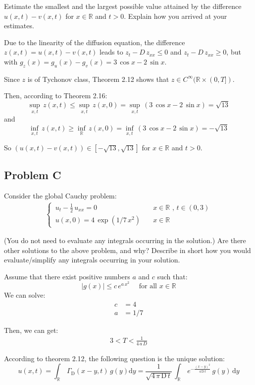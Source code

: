 \documentclass[../main.tex]{subfiles}
\begin{document}
Estimate the smallest and the largest possible value attained by the difference $u(x, t) - v(x, t)$ for $x \in \mathbb{R}$ and $t > 0$. Explain how you arrived at your estimates.

Due to the linearity of the diffusion equation, the difference $z(x,t) = u(x,t) - v(x,t)$ leads to $z_t - D \, z_{xx} \leqslant 0$ and $z_t - D \, z_{xx} \geqslant 0$, but with $g_z(x) = g_u(x) - g_v(x) = 3 \, \cos{x} - 2 \, \sin{x}$.

Since $z$ is of Tychonov class, Theorem 2.12 shows that $z \in C^{\infty}(\mathbb{R} \times (0,T])$.

Then, according to Theorem 2.16:
\begin{equation}
    \sup_{x,t} \, z(x,t) \leqslant \sup_{x,t} \, z(x,0) = \sup_{x,t} \, (3 \, \cos{x} - 2 \, \sin{x}) = \sqrt{13}
\end{equation}
and
\begin{equation}
    \inf_{x,t} \, z(x,t) \geqslant \inf_{\mathbb{R}} \, z(x,0) = \inf_{x,t} \, (3 \, \cos{x} - 2 \, \sin{x}) = - \sqrt{13}
\end{equation}

So $(u(x,t) - v(x,t)) \in [-\sqrt{13},\sqrt{13}]$ for $x \in \mathbb{R}$ and $t > 0$.

\subsection{Problem C}

Consider the global Cauchy problem:
\begin{align}
    \begin{cases}
        \, u_t - \frac{1}{2} \, u_{xx} = 0 \quad & x \in \mathbb{R} \text{ ,  } t \in (0,3) \\
        \, u(x,0) = 4 \, \exp{(1 / 7 \, x^2)} \quad & x \in \mathbb{R}
    \end{cases}
\end{align}

(You do not need to evaluate any integrals occurring in the solution.) Are there other solutions to the above problem, and why? Describe in short how you would evaluate/simplify any integrals occurring in your solution.

Assume that there exist positive numbers $a$ and $c$ such that:
\begin{equation}
    |g(x)| \leqslant c \, e^{a \, x^2} \quad \text{ for all  } x \in \mathbb{R}
\end{equation}
We can solve:
\begin{align}
    c &= 4 \\
    a &= 1 / 7
\end{align}

Then, we can get:
\begin{align}
    3 < T < \frac{1}{4 \, a \, D}
\end{align}

According to theorem 2.12, the following question is the unique solution:
\begin{equation}
    u(x,t) = \int_{\mathbb{R}} \, \Gamma_\mathrm{D}(x-y,t) \, g(y) \mathrm{d} y = \frac{1}{\sqrt{4 \, \pi \, \mathrm{D} \, t}} \, \int_{\mathbb{R}} \, e^{- \frac{(x-y)^2}{4 \,  \mathrm{D} \, t}} \, g(y) \, \mathrm{d} y 
\end{equation}
\end{document}
